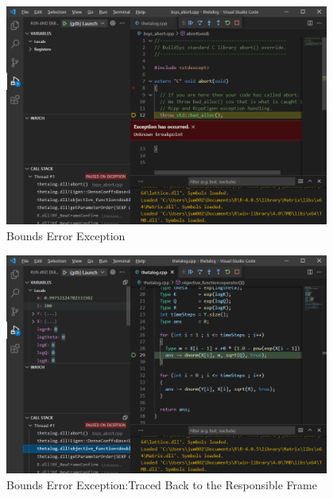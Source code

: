 \begin{Schunk}
  \begin{figure}[h]
  {\centering \includegraphics[width=0.95\textwidth]{BoundsErrorA} 

  }
  \caption[Bounds Error Exception]{Bounds Error Exception}\label{fig:BoundsErrorA}
  \end{figure}
\end{Schunk}

\begin{Schunk}
  \begin{figure}[h]
  {\centering \includegraphics[width=0.95\textwidth]{BoundsErrorB} 

  }
  \caption[Bounds Error Exception:Traced Back to the Responsible Frame]{Bounds Error Exception:Traced Back to the Responsible Frame}\label{fig:BoundsErrorB}
  \end{figure}
\end{Schunk}


